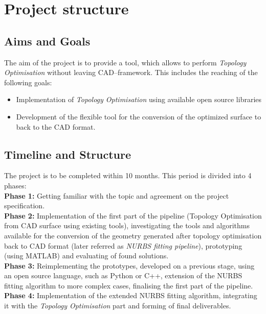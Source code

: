 \section{Project structure}
\subsection{Aims and Goals}
The aim of the project is to provide a tool, which allows to perform \textit{Topology Optimisation} without leaving CAD--framework. This includes the reaching of the following goals:
\begin{itemize}
\item Implementation of \textit{Topology Optimisation} using available open source libraries
\item Development of the flexible tool for the conversion of the optimized surface to back to the CAD format.
\end{itemize}
\subsection{Timeline and Structure}
The project is to be completed within 10 months. This period is divided into 4 phases:\\

\textbf{Phase 1:} Getting familiar with the topic and agreement on the project specification.\\

\textbf{Phase 2:} Implementation of the first part of the pipeline (Topology Optimisation from CAD surface using existing tools), investigating the tools and algorithms available for the conversion of the geometry generated after topology optimisation back to CAD format (later referred as \textit{NURBS fitting pipeline}), prototyping (using MATLAB) and evaluating of found solutions.\\

\textbf{Phase 3:} Reimplementing the prototypes, developed on a previous stage, using an open source language, such as Python or C++, extension of the NURBS fitting algorithm to more complex cases, finalising the first part of the pipeline.\\

\textbf{Phase 4:} Implementation of the extended NURBS fitting algorithm, integrating it with the \textit{Topology Optimisation} part and forming of final deliverables.

